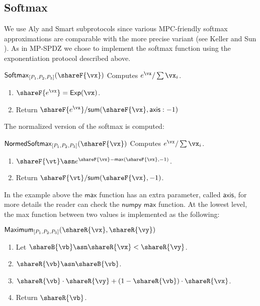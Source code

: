 \subsection{Softmax}
\label{subsec:softmax}

We use Aly and Smart subprotocols since various MPC-friendly softmax
approximations are comparable with the more precise variant (see Keller and Sun
\cite{keller2021effectiveness}). As in MP-SPDZ we chose to implement the softmax
function using the exponentiation protocol described above.

\msubsubsection
  {$\mathsf{Softmax}_{[P_1, P_2, P_3]}(\shareF{\vx})$}
  Computes $e^\vx / \sum \vx_i$.
\begin{enumerate}
    \item $\shareF{e^\vx} = \mathsf{Exp}(\vx)$.
    \item Return $\shareF{e^\vx} / \mathsf{sum}(\shareF{\vx}, \mathsf{axis}:-1)$
\end{enumerate}

The normalized version of the softmax is computed:

\msubsubsection
  {$\mathsf{NormedSoftmax}_{[P_1, P_2, P_3]}(\shareF{\vx})$}
  Computes $e^\vx / \sum \vx_i$.
\begin{enumerate}
    \item $\shareF{\vt} \asn e^{\shareF{\vx} -\mathsf{max}(\shareF{\vx}, -1)}$.
    \item Return $\shareF{\vt} / \mathsf{sum}(\shareF{\vx}, -1)$.
\end{enumerate}


\noindent In the example above the $\mathsf{max}$ function has an extra parameter, called $\mathsf{axis}$,
for more details the reader can check the $\mathsf{numpy}$ $\mathsf{max}$ function.
At the lowest level, the max function between two values is implemented as the
following:


\msubsubsection
  {$\mathsf{Maximum}_{[P_1, P_2, P_3]}(\shareR{\vx}, \shareR{\vy})$}
\begin{enumerate}
    \item Let $\shareB{\vb} \asn \shareR{\vx} < \shareR{\vy}$.
    \item $\shareR{\vb} \asn \shareB{\vb}$.
    \item $\shareR{\vb} \cdot \shareR{\vy} + (1 - \shareR{\vb}) \cdot \shareR{\vx}$.
    \item Return $\shareR{\vb}$.
\end{enumerate}


